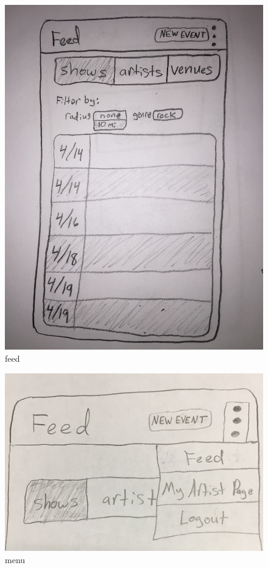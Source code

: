 \documentclass[a4paper]{article}
\begin{document}
\begin{figure}[H]
  \centering
  \begin{minipage}[b]{0.5\textwidth}
    \includegraphics[width=\textwidth]{feed.jpg}
    \caption{feed}
  \end{minipage}
\end{figure}

\begin{figure}[H]
  \centering
  \begin{minipage}[b]{0.85\textwidth}
    \includegraphics[width=\textwidth]{menu.jpg}
    \caption{menu}
  \end{minipage}
\end{figure}
\end{document}
